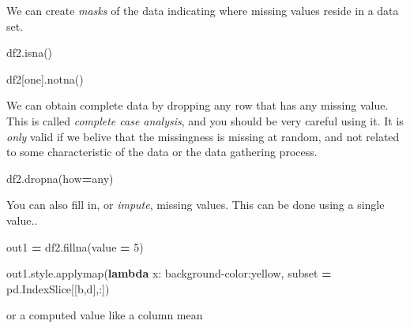 \documentclass[
  letterpaper,
]{scrbook}
\newenvironment{Shaded}{\begin{snugshade}}{\end{snugshade}}
\newcommand{\DecValTok}[1]{\textcolor[rgb]{0.00,0.00,0.81}{#1}}
\newcommand{\KeywordTok}[1]{\textcolor[rgb]{0.13,0.29,0.53}{\textbf{#1}}}
\newcommand{\NormalTok}[1]{#1}
\newcommand{\OperatorTok}[1]{\textcolor[rgb]{0.81,0.36,0.00}{\textbf{#1}}}
\newcommand{\StringTok}[1]{\textcolor[rgb]{0.31,0.60,0.02}{#1}}
\begin{document}
We can create \emph{masks} of the data indicating where missing values reside in a data set.

\begin{Shaded}
\begin{Highlighting}[]
\NormalTok{df2.isna()}
\end{Highlighting}
\end{Shaded}

\begin{Shaded}
\begin{Highlighting}[]
\NormalTok{df2[}\StringTok{\textquotesingle{}one\textquotesingle{}}\NormalTok{].notna()}
\end{Highlighting}
\end{Shaded}

We can obtain complete data by dropping any row that has any missing value. This is called \emph{complete case analysis}, and you should be very careful using it. It is \emph{only} valid if we belive that the missingness is missing at random, and not related to some characteristic of the data or the data gathering process.

\begin{Shaded}
\begin{Highlighting}[]
\NormalTok{df2.dropna(how}\OperatorTok{=}\StringTok{\textquotesingle{}any\textquotesingle{}}\NormalTok{)}
\end{Highlighting}
\end{Shaded}

You can also fill in, or \emph{impute}, missing values. This can be done using a single value..

\begin{Shaded}
\begin{Highlighting}[]
\NormalTok{out1 }\OperatorTok{=}\NormalTok{ df2.fillna(value }\OperatorTok{=} \DecValTok{5}\NormalTok{)}

\NormalTok{out1.style.applymap(}\KeywordTok{lambda}\NormalTok{ x: }\StringTok{\textquotesingle{}background{-}color:yellow\textquotesingle{}}\NormalTok{, subset }\OperatorTok{=}\NormalTok{ pd.IndexSlice[[}\StringTok{\textquotesingle{}b\textquotesingle{}}\NormalTok{,}\StringTok{\textquotesingle{}d\textquotesingle{}}\NormalTok{],:])}
\end{Highlighting}
\end{Shaded}

or a computed value like a column mean
\end{document}
